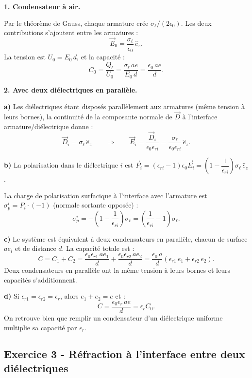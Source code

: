 \documentclass[12pt,a4paper]{article}
\begin{document}
\begin{boitecorrige}

\textbf{1. Condensateur à air.}

Par le théorème de Gauss, chaque armature crée $\sigma_\ell/(2\epsilon_0)$. Les deux contributions s'ajoutent entre les armatures :
\[
\vec{E}_0 = \frac{\sigma_\ell}{\epsilon_0}\,\hat{e}_z.
\]
La tension est $U_0 = E_0\,d$, et la capacité :
\[
C_0 = \frac{Q_\ell}{U_0} = \frac{\sigma_\ell\,ae}{E_0\,d} = \frac{\epsilon_0\,ae}{d}.
\]

\textbf{2. Avec deux diélectriques en parallèle.}

\textbf{a)} Les diélectriques étant disposés parallèlement aux armatures (même tension à leurs bornes), la continuité de la composante normale de $\vec{D}$ à l'interface armature/diélectrique donne :
\[
\vec{D}_i = \sigma_\ell\,\hat{e}_z
\qquad\Rightarrow\qquad
\vec{E}_i = \frac{\vec{D}_i}{\epsilon_0\epsilon_{ri}} = \frac{\sigma_\ell}{\epsilon_0\epsilon_{ri}}\,\hat{e}_z.
\]

\textbf{b)} La polarisation dans le diélectrique $i$ est $\vec{P}_i = (\epsilon_{ri}-1)\epsilon_0\vec{E}_i = \left(1-\dfrac{1}{\epsilon_{ri}}\right)\sigma_\ell\,\hat{e}_z$.

La charge de polarisation surfacique à l'interface avec l'armature est $\sigma_p^i = P_i\cdot(-1)$ (normale sortante opposée) :
\[
\sigma_p^i = -\left(1 - \frac{1}{\epsilon_{ri}}\right)\sigma_\ell = \left(\frac{1}{\epsilon_{ri}}-1\right)\sigma_\ell.
\]

\textbf{c)} Le système est équivalent à deux condensateurs en parallèle, chacun de surface $ae_i$ et de distance $d$. La capacité totale est :
\[
C = C_1 + C_2 = \frac{\epsilon_0\epsilon_{r1}\,ae_1}{d} + \frac{\epsilon_0\epsilon_{r2}\,ae_2}{d}
= \frac{\epsilon_0\,a}{d}\!\left(\epsilon_{r1}\,e_1+\epsilon_{r2}\,e_2\right).
\]
Deux condensateurs en parallèle ont la même tension à leurs bornes et leurs capacités s'additionnent.

\textbf{d)} Si $\epsilon_{r1}=\epsilon_{r2}=\epsilon_r$, alors $e_1+e_2=e$ et :
\[
C = \frac{\epsilon_0\epsilon_r\,ae}{d} = \epsilon_r C_0.
\]
On retrouve bien que remplir un condensateur d'un diélectrique uniforme multiplie sa capacité par $\epsilon_r$.

\end{boitecorrige}

\subsection*{Exercice 3 - Réfraction à l'interface entre deux diélectriques \niveau{\moyen}}
\end{document}
